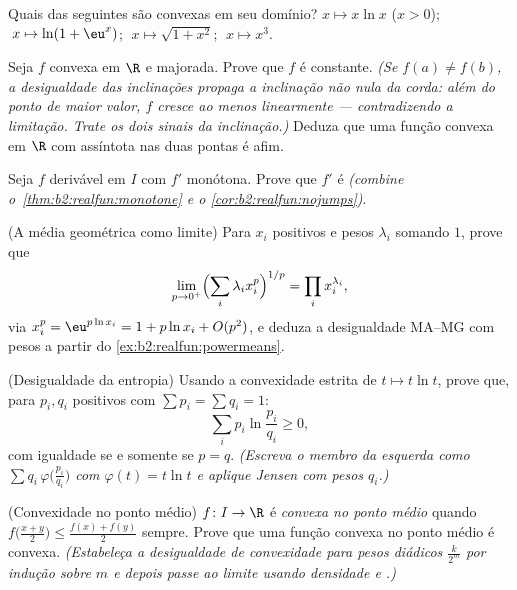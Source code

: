 \begin{exercise}[$\star$]\label{exo:b2:realfun:3}
Quais das seguintes são convexas em seu domínio? $x \mapsto
x\ln x$ ($x > 0$); $\;x \mapsto \ln(1 + \eu^x)$; $\;x \mapsto
\sqrt{1 + x^2}$; $\;x \mapsto x^3$.
\end{exercise}

\begin{exercise}[$\star\star$]\label{exo:b2:realfun:4}
Seja $f$ convexa em $\R$ e majorada. Prove que $f$ é
constante. \emph{(Se $f(a) \neq f(b)$, a desigualdade das inclinações
propaga a inclinação não nula da corda: além do ponto de maior
valor, $f$ cresce ao menos linearmente --- contradizendo a limitação.
Trate os dois sinais da inclinação.)} Deduza que uma função convexa em
$\R$ com assíntota nas duas pontas é afim.
\end{exercise}

\begin{exercise}[$\star\star$]\label{exo:b2:realfun:5}
Seja $f$ derivável em $I$ com $f'$ monótona. Prove que
$f'$ é  \emph{(combine
o~\cref{thm:b2:realfun:monotone} e o
\cref{cor:b2:realfun:nojumps})}.
\end{exercise}

\begin{exercise}[$\star\star$]\label{exo:b2:realfun:6}
(A média geométrica como limite) Para $x_i$ positivos e pesos
$\lambda_i$ somando $1$, prove que
\[
\lim_{p \to 0^+} \Bigl(\sum_i \lambda_i x_i^p\Bigr)^{1/p}
= \prod_i x_i^{\lambda_i} ,
\]
via $x_i^p = \eu^{p\ln x_i} = 1 + p\ln x_i + O(p^2)$, e deduza
a desigualdade MA--MG com pesos a partir do
\cref{ex:b2:realfun:powermeans}.
\end{exercise}

\begin{exercise}[$\star\star$]\label{exo:b2:realfun:7}
(Desigualdade da entropia) Usando a convexidade estrita de $t \mapsto t\ln t$,
prove que, para $p_i, q_i$ positivos com $\sum p_i = \sum q_i = 1$:
\[
\sum_i p_i \ln\frac{p_i}{q_i} \geq 0 ,
\]
com igualdade se e somente se $p = q$. \emph{(Escreva o membro da esquerda como $\sum q_i\,
\varphi\bigl(\frac{p_i}{q_i}\bigr)$ com $\varphi(t) = t\ln t$ e
aplique Jensen com pesos $q_i$.)}
\end{exercise}

\begin{exercise}[$\star\star\star$]\label{exo:b2:realfun:8}
(Convexidade no ponto médio) $f \colon I \to \R$ é \emph{convexa no ponto médio}
quando $f\bigl(\frac{x+y}{2}\bigr) \leq \frac{f(x) + f(y)}{2}$
sempre. Prove que uma função \emph{} convexa no ponto médio é
convexa. \emph{(Estabeleça a desigualdade de convexidade para pesos
diádicos $\frac{k}{2^m}$ por indução sobre $m$ e depois passe ao limite
usando densidade e .)}
\end{exercise}

